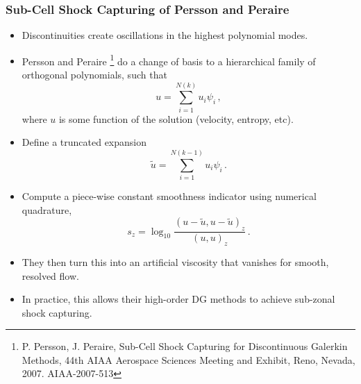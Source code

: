 \documentclass[8pt,xcolor=svgnames]{beamer}
\begin{document}
\begin{frame}\frametitle{Sub-Cell Shock Capturing of Persson and Peraire}
\begin{itemize}
\item Discontinuities create oscillations in the highest polynomial modes.
\item Persson and Peraire
\footnote{P. Persson, J. Peraire, Sub-Cell Shock Capturing for Discontinuous
Galerkin Methods, 44th AIAA Aerospace Sciences Meeting and Exhibit, Reno,
Nevada, 2007. AIAA-2007-513}
do a change of basis to a hierarchical family of orthogonal polynomials, such that
\[
u=\sum_{i=1}^{N(k)}u_{i}\psi_i\,,
\]
where $u$ is some function of the solution (velocity, entropy, etc).
\item Define a truncated expansion
\[
\tilde u=\sum_{i=1}^{N(k-1)}u_{i}\psi_i\,.
\]
\item Compute a piece-wise constant smoothness indicator using numerical quadrature,
\[
s_z=\log_{10}\frac{(u-\tilde u,u-\tilde u)_z}{(u,u)_z}\,.
\]
\item They then turn this into an artificial viscosity that vanishes for smooth, resolved flow.
\item In practice, this allows their high-order DG methods to achieve sub-zonal shock capturing.
\end{itemize}
\end{frame}
\end{document}
